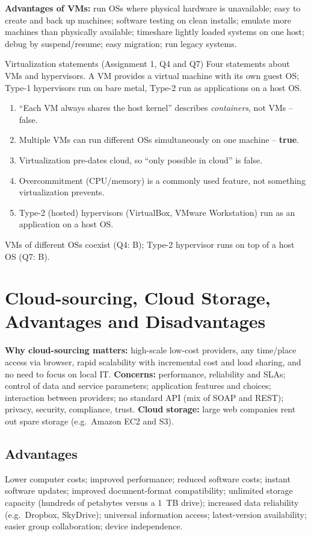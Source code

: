 \textbf{Advantages of VMs:} run OSs where physical hardware is unavailable; easy to create and back up
machines; software testing on clean installs; emulate more machines than physically available;
timeshare lightly loaded systems on one host; debug by suspend/resume; easy migration; run legacy
systems.

\begin{solved}{Virtualization statements (Assignment 1, Q4 and Q7)}
\Given Four statements about VMs and hypervisors.
\Formula A VM provides a virtual machine with its own guest OS; Type-1 hypervisors run on bare metal,
Type-2 run as applications on a host OS.
\Steps
\begin{enumerate}[leftmargin=*]
  \item ``Each VM always shares the host kernel'' describes \emph{containers}, not VMs -- false.
  \item Multiple VMs can run different OSs simultaneously on one machine -- \textbf{true}.
  \item Virtualization pre-dates cloud, so ``only possible in cloud'' is false.
  \item Overcommitment (CPU/memory) is a commonly used feature, not something virtualization prevents.
  \item Type-2 (hosted) hypervisors (VirtualBox, VMware Workstation) run as an application on a host OS.
\end{enumerate}
\Answer VMs of different OSs coexist (Q4: B); Type-2 hypervisor runs on top of a host OS (Q7: B).
\end{solved}

\section{Cloud-sourcing, Cloud Storage, Advantages and Disadvantages}
\textbf{Why cloud-sourcing matters:} high-scale low-cost providers, any time/place access via browser,
rapid scalability with incremental cost and load sharing, and no need to focus on local IT.
\textbf{Concerns:} performance, reliability and SLAs; control of data and service parameters;
application features and choices; interaction between providers; no standard API (mix of SOAP and REST);
privacy, security, compliance, trust.
\textbf{Cloud storage:} large web companies rent out spare storage (e.g.\ Amazon EC2 and S3).

\subsection{Advantages}
Lower computer costs; improved performance; reduced software costs; instant software updates; improved
document-format compatibility; unlimited storage capacity (hundreds of petabytes versus a 1~TB drive);
increased data reliability (e.g.\ Dropbox, SkyDrive); universal information access; latest-version
availability; easier group collaboration; device independence.

